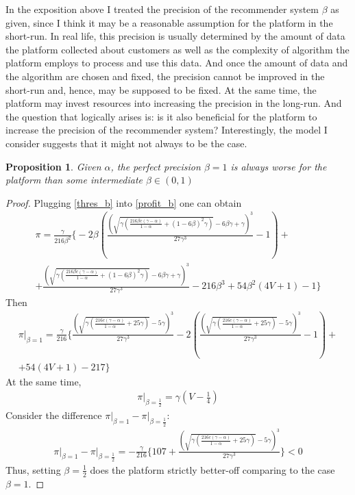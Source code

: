 \documentclass[a4paper]{article}
\newtheorem{proposition}[theorem]{Proposition}
\begin{document}
In the exposition above I treated the precision of the recommender system $\beta$ as given, since I think it may be a reasonable assumption for the platform in the short-run. In real life, this precision is usually determined by the amount of data the platform collected about customers as well as the complexity of algorithm the platform employs to process and use this data. And once the amount of data and the algorithm are chosen and  fixed, the precision cannot be improved in the short-run and, hence, may be supposed to be fixed. At the same time, the platform may invest resources into increasing the precision in the long-run. And the question that logically arises is: is it also beneficial for the platform to increase the precision of the recommender system? Interestingly, the model I consider suggests that it might not always to be the case.
\begin{proposition}
	Given $\alpha$, the perfect precision $\beta = 1$ is always worse for the platform than some intermediate $\beta \in (0, 1)$
\end{proposition}
\begin{proof}
	Plugging \eqref{thres_b} into \eqref{profit_b} one can obtain
	\begin{align*}
	\pi = \frac{\gamma}{216 \beta ^2}  \biggl\{-2 \beta  \left(\frac{\left(\sqrt{\gamma  \left(\frac{216 \beta  c (\gamma-\alpha)}{1-\alpha}+(1-6
				\beta )^2 \gamma \right)}-6 \beta  \gamma +\gamma \right)^3}{27 \gamma ^3}-1\right)+\\
			+\frac{\left(\sqrt{\gamma 
				\left(\frac{216 \beta  c (\gamma - \alpha)}{1-\alpha}+(1-6 \beta )^2 \gamma \right)}-6 \beta  \gamma +\gamma
			\right)^3}{27 \gamma ^3}-216 \beta ^3+54 \beta ^2 (4 V+1)-1\biggr\}
	\end{align*}
	Then
	\begin{align*}
	\pi\bigg|_{\beta = 1} = \frac{\gamma }{216} \biggl\{\frac{\left(\sqrt{\gamma  \left(\frac{216 c (\gamma-\alpha)}{1-\alpha}+25 \gamma \right)}-5
		\gamma \right)^3}{27 \gamma ^3}-2 \left(\frac{\left(\sqrt{\gamma  \left(\frac{216 c (\gamma-\alpha)}{1-\alpha}+25
			\gamma \right)}-5 \gamma \right)^3}{27 \gamma ^3}-1\right)+\\
		+54 (4 V+1)-217\biggr\}
	\end{align*}
	At the same time, 
	\begin{align*}
	\pi \bigg|_{\beta = \frac{1}{2}} = \gamma  \left(V-\frac{1}{4}\right)
	\end{align*}
	Consider the difference $\pi\bigg|_{\beta = 1} - \pi\bigg|_{\beta = \frac{1}{2}}$:
	\begin{align*}
	\pi\bigg|_{\beta = 1} - \pi\bigg|_{\beta = \frac{1}{2}} = -\frac{\gamma}{216} \biggl\{ 107+ \frac{\left(\sqrt{\gamma  \left(\frac{216 c (\gamma-\alpha)}{1-\alpha}+25 \gamma \right)}-5
		\gamma \right)^3}{27 \gamma ^3} \biggr\} < 0
	\end{align*}
	Thus, setting $\beta = \frac{1}{2}$ does the platform strictly better-off comparing to the case $\beta = 1$.
\end{proof}
\end{document}
